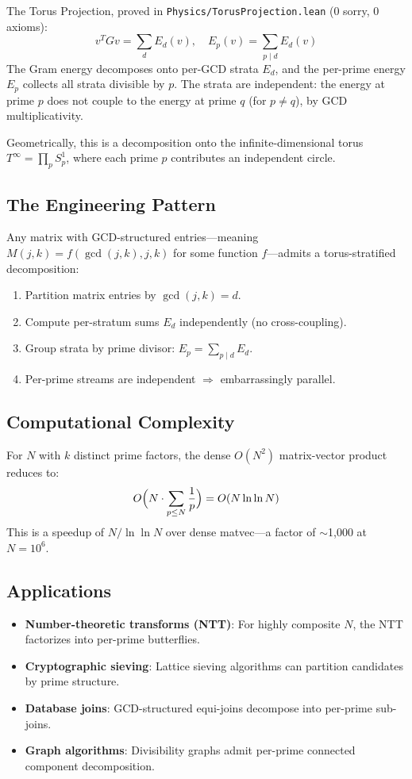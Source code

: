 \documentclass[11pt,a4paper]{article}
\begin{document}
The Torus Projection, proved in
\texttt{Physics/TorusProjection.lean} (0 sorry, 0 axioms):
\begin{equation}
  v^T G v = \sum_d E_d(v), \quad
  E_p(v) = \sum_{p \mid d} E_d(v)
\end{equation}
The Gram energy decomposes onto per-GCD strata $E_d$, and the
per-prime energy $E_p$ collects all strata divisible by $p$.
The strata are independent: the energy at prime $p$ does not
couple to the energy at prime $q$ (for $p \neq q$), by
GCD multiplicativity.

Geometrically, this is a decomposition onto the infinite-dimensional
torus $T^\infty = \prod_p S^1_p$, where each prime $p$ contributes
an independent circle.

\subsection{The Engineering Pattern}

Any matrix with GCD-structured entries---meaning
$M(j,k) = f(\gcd(j,k), j, k)$ for some function $f$---admits
a torus-stratified decomposition:
\begin{enumerate}
  \item Partition matrix entries by $\gcd(j,k) = d$.
  \item Compute per-stratum sums $E_d$ independently (no
    cross-coupling).
  \item Group strata by prime divisor: $E_p = \sum_{p \mid d} E_d$.
  \item Per-prime streams are independent $\Rightarrow$ embarrassingly
    parallel.
\end{enumerate}

\subsection{Computational Complexity}

For $N$ with $k$ distinct prime factors, the dense
$O(N^2)$ matrix-vector product reduces to:
\[
  O\Bigl(N \cdot \sum_{p \leq N} \frac{1}{p}\Bigr)
  = O(N \ln\ln N)
\]
This is a speedup of $N / \ln\ln N$ over dense matvec---a factor
of $\sim$1{,}000 at $N = 10^6$.

\subsection{Applications}

\begin{itemize}
  \item \textbf{Number-theoretic transforms (NTT)}: For highly
    composite $N$, the NTT factorizes into per-prime butterflies.
  \item \textbf{Cryptographic sieving}: Lattice sieving algorithms
    can partition candidates by prime structure.
  \item \textbf{Database joins}: GCD-structured equi-joins decompose
    into per-prime sub-joins.
  \item \textbf{Graph algorithms}: Divisibility graphs admit
    per-prime connected component decomposition.
\end{itemize}
\end{document}
